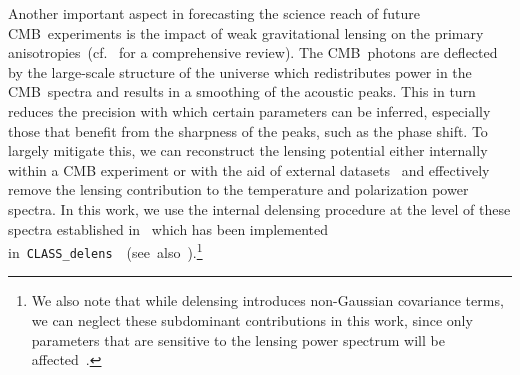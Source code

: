Another important aspect in forecasting the science reach of future CMB~experiments is the impact of weak gravitational lensing on the primary anisotropies~(cf.~\cite{Lewis:2006fu} for a comprehensive review). The CMB~photons are deflected by the large-scale structure of the universe which redistributes power in the CMB~spectra and results in a smoothing of the acoustic peaks. This in turn reduces the precision with which certain parameters can be inferred, especially those that benefit from the sharpness of the peaks, such as the phase shift. To largely mitigate this, we can reconstruct the lensing potential either internally within a CMB experiment or with the aid of external datasets~\cite{Okamoto:2003zw, Smith:2010gu, Larsen:2016wpa, Green:2016cjr, Sehgal:2016eag, Carron:2017vfg, ACT:2020goa, Millea:2020iuw, Hotinli:2021umk, SPT-3G:2024atg} and effectively remove the lensing contribution to the temperature and polarization power spectra. In this work, we use the internal delensing procedure at the level of these spectra established in~\cite{Green:2016cjr} which has been implemented \mbox{in \texttt{CLASS\_delens}~\cite{Hotinli:2021umk}~(see also~\cite{Trendafilova:2023xtq})}.\footnote{We also note that while delensing introduces non-Gaussian covariance terms, we can neglect these subdominant contributions in this work, since only parameters that are sensitive to the lensing power spectrum will be affected~\cite{Green:2016cjr}.}\medskip

